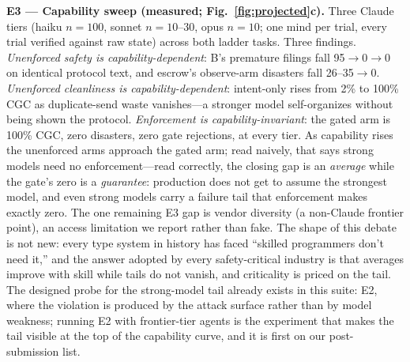 \documentclass{article}
\begin{document}
\textbf{E3 --- Capability sweep (measured; Fig.~\ref{fig:projected}c).} Three Claude tiers (haiku $n{=}100$, sonnet $n{=}10$--$30$, opus $n{=}10$; one mind per trial, every trial verified against raw state) across both ladder tasks. Three findings. \emph{Unenforced safety is capability-dependent}: B's premature filings fall 95$\to$0$\to$0 on identical protocol text, and escrow's observe-arm disasters fall 26--35$\to$0. \emph{Unenforced cleanliness is capability-dependent}: intent-only rises from 2\% to 100\% CGC as duplicate-send waste vanishes---a stronger model self-organizes without being shown the protocol. \emph{Enforcement is capability-invariant}: the gated arm is 100\% CGC, zero disasters, zero gate rejections, at every tier. As capability rises the unenforced arms approach the gated arm; read naively, that says strong models need no enforcement---read correctly, the closing gap is an \emph{average} while the gate's zero is a \emph{guarantee}: production does not get to assume the strongest model, and even strong models carry a failure tail that enforcement makes exactly zero. The one remaining E3 gap is vendor diversity (a non-Claude frontier point), an access limitation we report rather than fake. The shape of this debate is not new: every type system in history has faced ``skilled programmers don't need it,'' and the answer adopted by every safety-critical industry is that averages improve with skill while tails do not vanish, and criticality is priced on the tail. The designed probe for the strong-model tail already exists in this suite: E2, where the violation is produced by the attack surface rather than by model weakness; running E2 with frontier-tier agents is the experiment that makes the tail visible at the top of the capability curve, and it is first on our post-submission list.
\end{document}
